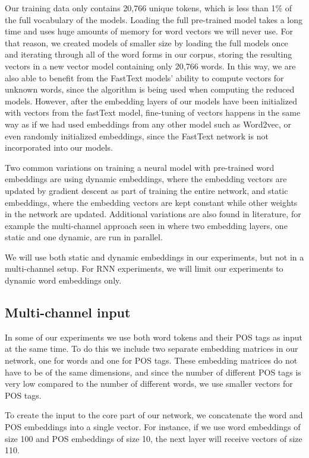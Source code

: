 Our training data only contains 20,766 unique tokens, which is less than 1\%
of the full vocabulary of the models. Loading the full pre-trained model
takes a long time and uses huge amounts of memory for word vectors we will
never use. For that reason, we created models of smaller size by loading the
full models once and iterating through all of the word forms in our corpus,
storing the resulting vectors in a new vector model containing only 20,766
words. In this way, we are also able to benefit from the FastText models'
ability to compute vectors for unknown words, since the \ngram algorithm is
being used when computing the reduced models. However, after the embedding
layers of our models have been initialized with vectors from the fastText
model, fine-tuning of vectors happens in the same way as if we had used
embeddings from any other model such as Word2vec, or even randomly
initialized embeddings, since the FastText network is not incorporated into
our models.

Two common variations on training a neural model with pre-trained word
embeddings are using dynamic embeddings, where the embedding vectors are
updated by gradient descent as part of training the entire network, and
static embeddings, where the embedding vectors are kept constant while other
weights in the network are updated. Additional variations are also found in
literature, for example the multi-channel approach seen in
\textcite{kim2014convolutional} where two embedding layers, one static and
one dynamic, are run in parallel.

We will use both static and dynamic embeddings in our experiments, but not in
a multi-channel setup. For RNN experiments, we will limit our experiments to
dynamic word embeddings only.


\subsection{Multi-channel input}

In some of our experiments we use both word tokens and their POS tags as
input at the same time. To do this we include two separate embedding matrices
in our network, one for words and one for POS tags. These embedding matrices
do not have to be of the same dimensions, and since the number of different
POS tags is very low compared to the number of different words, we use
smaller vectors for POS tags.

To create the input to the core part of our network, we concatenate the word
and POS embeddings into a single vector. For instance, if we use word
embeddings of size 100 and POS embeddings of size 10, the next layer will
receive vectors of size 110.


